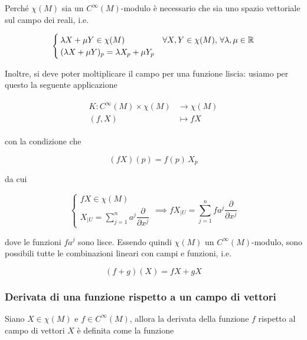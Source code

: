 Perché $ \chi(M) $ sia un $ C^{\infty}(M) $-modulo è necessario che sia uno spazio vettoriale sul campo dei reali, i.e.

\begin{equation}
	\begin{cases}
		\lambda X + \mu Y \in \chi(M) & \forall X,Y \in \chi(M), \, \forall \lambda,\mu \in \mathbb{R}\\
		(\lambda X + \mu Y)_{p} = \lambda X_{p} + \mu Y_{p}
	\end{cases}
\end{equation}

Inoltre, si deve poter moltiplicare il campo per una funzione liscia: usiamo per questo la seguente applicazione

\begin{align}
	\begin{split}
		K : C^{\infty}(M) \times \chi(M) &\to \chi(M)\\
		(f,X) &\mapsto f X
	\end{split}
\end{align}

con la condizione che

\begin{equation}
	(f X)(p) = f(p) \, X_{p}
\end{equation}

da cui

\begin{equation}
	\begin{cases}
		f X \in \chi(M)\\
		X_{|U} = \sum_{j=1}^{n} a^{j} \dfrac{\partial}{\partial x^{j}}
	\end{cases}%
	\implies%
	f X_{|U} = \sum_{j=1}^{n} f a^{j} \dfrac{\partial}{\partial x^{j}}
\end{equation}

dove le funzioni $ f a^{j} $ sono lisce. Essendo quindi $ \chi(M) $ un $ C^{\infty}(M) $-modulo, sono possibili tutte le combinazioni lineari con campi e funzioni, i.e.

\begin{equation}
	(f+g)(X) = f X + g X
\end{equation}

\subsubsection{Derivata di una funzione rispetto a un campo di vettori}

Siano $ X \in \chi(M) $ e $ f \in C^{\infty}(M) $, allora la derivata della funzione $ f $ rispetto al campo di vettori $ X $ è definita come la funzione

